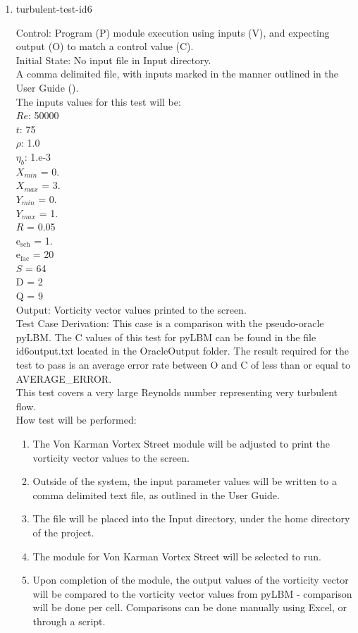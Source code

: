 \documentclass[12pt, titlepage]{article}
\begin{document}
\begin{enumerate}
\item{turbulent-test-id6\\}

Control: Program (P) module execution using inputs (V), and expecting output (O) to match a control value (C).\\
					
Initial State: No input file in Input directory.\\
					
A comma delimited file, with inputs marked in the manner outlined in the User Guide (\citet{LBM_UserGuide_PM}).\\The inputs values for this test will be:\\
$Re$: 50000\\
$t$: 75\\
$\rho$: 1.0\\
$\eta_b$: 1.e-3\\
$X_{min}$ = 0.\\
$X_{max}$ = 3.\\
$Y_{min}$ = 0.\\
$Y_{max}$ = 1.\\
$R$ = 0.05\\
$\mathrm{e_{sch}}$ = 1.\\
$\mathrm{e_{fac}}$ = 20\\
$S$ = 64\\
$\mathrm{D}$ = 2\\
$\mathrm{Q}$ = 9\\

Output: Vorticity vector values printed to the screen. \\

Test Case Derivation: This case is a comparison with the pseudo-oracle pyLBM. The C values of this test for pyLBM can be found in the file id6output.txt located in the OracleOutput folder. The result required for the test to pass is an average error rate between O and C of less than or equal to AVERAGE\_ERROR.\\
This test covers a very large Reynolds number representing very turbulent flow.\\	

					
How test will be performed: 

\begin{enumerate}
\item The Von Karman Vortex Street module will be adjusted to print the vorticity vector values to the screen.
\item Outside of the system, the input parameter values will be written to a comma delimited text file, as outlined in the User Guide.
\item The file will be placed into the Input directory, under the home directory of the project.
\item The module for Von Karman Vortex Street will be selected to run.
\item Upon completion of the module, the output values of the vorticity vector will be compared to the vorticity vector values from pyLBM - comparison will be done per cell. Comparisons can be done manually using Excel, or through a script.\\
\end{enumerate}


\end{enumerate}
\end{document}
